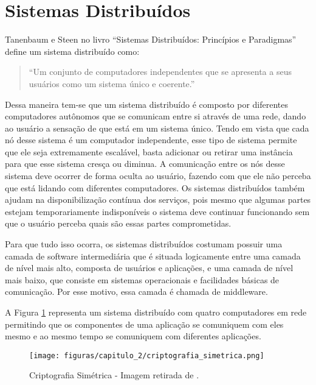 \section{Sistemas Distribuídos}

    Tanenbaum e Steen no livro “Sistemas Distribuídos: Princípios e Paradigmas” define um sistema distribuído como: %

    \begin{quote}
        ``Um conjunto de computadores independentes que se apresenta a seus usuários como um sistema único e coerente.''
     \end{quote}

    Dessa maneira tem-se que um sistema distribuído é composto por diferentes computadores autônomos que se comunicam entre si através de uma rede, dando ao usuário a sensação de que está em um sistema único. Tendo em vista que cada nó desse sistema é um computador independente, esse tipo de sistema permite que ele seja extremamente escalável, basta adicionar ou retirar uma instância para que esse sistema cresça ou diminua. A comunicação entre os nós desse sistema deve ocorrer de forma oculta ao usuário, fazendo com que ele não perceba que está lidando com diferentes computadores. Os sistemas distribuídos também ajudam na disponibilização contínua dos serviços, pois mesmo que algumas partes estejam temporariamente indisponíveis o sistema deve continuar funcionando sem que o usuário perceba quais são essas partes comprometidas.

    Para que tudo isso ocorra, os sistemas distribuídos costumam possuir uma camada de software intermediária que é situada logicamente entre uma camada de nível mais alto, composta de usuários e aplicações, e uma camada de nível mais baixo, que consiste em sistemas operacionais e facilidades básicas de comunicação. Por esse motivo, essa camada é chamada de middleware.

    A Figura \ref{fig:imagem_criptografia_simetrica} representa um sistema distribuído com quatro computadores em rede permitindo que os componentes de uma aplicação se comuniquem com eles mesmo e ao mesmo tempo se comuniquem com diferentes aplicações.
            
    \begin{figure}[h]
            \centering
            \texttt{[image: figuras/capitulo\_2/criptografia\_simetrica.png]}
            \caption{Criptografia Simétrica - Imagem retirada de \cite{beginnig_blockchain_bikramaditya}.}
            \label{fig:imagem_criptografia_simetrica}
    \end{figure}



    